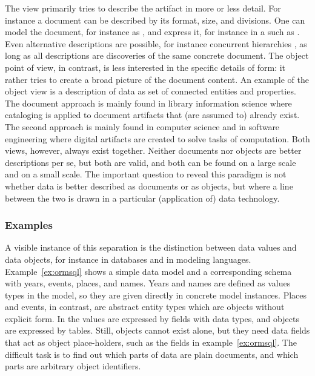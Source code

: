 The  view primarily tries
to describe the artifact in more or less detail. For instance a document can be
described by its format, size, and divisions. One can model the document, for
instance as , and
express it, for instance in a  such as . Even
alternative descriptions are possible, for instance concurrent hierarchies
\cite{Renear1996,Pondorf2010}, as long as all descriptions are discoveries of
the same concrete document. The object point of view, in contrast, is less
interested in the specific details of form: it rather tries to create a broad
picture of the document content. An example of the object view is a description
of data as set of connected entities and properties. The document approach is
mainly found in library information science where cataloging is applied to
document artifacts that (are assumed to) already exist. The second approach is
mainly found in computer science and in software engineering where digital
artifacts are created to solve tasks of computation. 
Both views, however, always exist together. Neither documents nor objects are
better descriptions per se, but both are valid, and both can be found on a
large scale and on a small scale. The important question to reveal this
paradigm is not whether data is better described as documents or as objects,
but where a line between the two is drawn in a particular (application of) data
technology. 

\subsubsection{Examples}
\label{sec:docobjex}

A visible instance of this separation is the distinction between
data values and data objects, for instance in databases and in modeling
languages.  Example~\ref{ex:ormsql} shows a simple  data model and a
corresponding  schema with years, events, places, and names. Years
and names are defined as values types in the model, so they are given directly
in concrete model instances. Places and events, in contrast, are abstract
entity types which are objects without explicit form.  In the  values are expressed by fields with data types, and objects are
expressed by tables.  Still, objects cannot exist alone, but they need data
fields that act as object place-holders, such as the  fields in
example~\ref{ex:ormsql}. The difficult task is to find out which parts of data
are plain documents, and which parts are arbitrary object identifiers.

